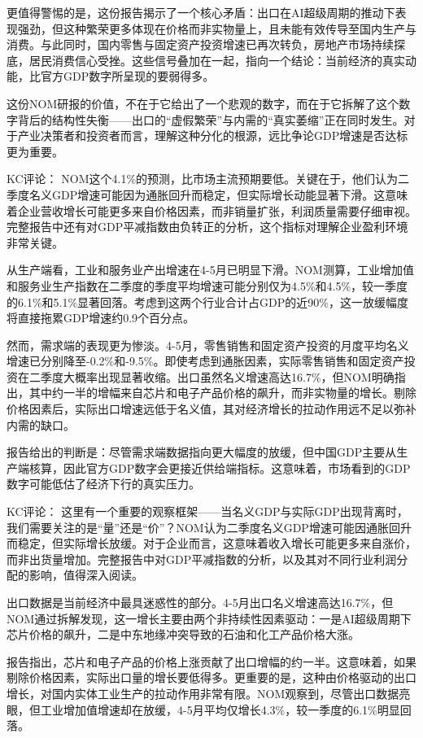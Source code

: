 \documentclass[11pt]{ctexart}
\begin{document}
更值得警惕的是，这份报告揭示了一个核心矛盾：出口在AI超级周期的推动下表现强劲，但这种繁荣更多体现在价格而非实物量上，且未能有效传导至国内生产与消费。与此同时，国内零售与固定资产投资增速已再次转负，房地产市场持续探底，居民消费信心受挫。这些信号叠加在一起，指向一个结论：当前经济的真实动能，比官方GDP数字所呈现的要弱得多。

这份NOM研报的价值，不在于它给出了一个悲观的数字，而在于它拆解了这个数字背后的结构性失衡——出口的“虚假繁荣”与内需的“真实萎缩”正在同时发生。对于产业决策者和投资者而言，理解这种分化的根源，远比争论GDP增速是否达标更为重要。

KC评论： NOM这个4.1\%的预测，比市场主流预期要低。关键在于，他们认为二季度名义GDP增速可能因为通胀回升而稳定，但实际增长动能显著下滑。这意味着企业营收增长可能更多来自价格因素，而非销量扩张，利润质量需要仔细审视。完整报告中还有对GDP平减指数由负转正的分析，这个指标对理解企业盈利环境非常关键。

从生产端看，工业和服务业产出增速在4-5月已明显下滑。NOM测算，工业增加值和服务业生产指数在二季度的季度平均增速可能分别仅为4.5\%和4.5\%，较一季度的6.1\%和5.1\%显著回落。考虑到这两个行业合计占GDP的近90\%，这一放缓幅度将直接拖累GDP增速约0.9个百分点。

然而，需求端的表现更为惨淡。4-5月，零售销售和固定资产投资的月度平均名义增速已分别降至-0.2\%和-9.5\%。即使考虑到通胀因素，实际零售销售和固定资产投资在二季度大概率出现显著收缩。出口虽然名义增速高达16.7\%，但NOM明确指出，其中约一半的增幅来自芯片和电子产品价格的飙升，而非实物量的增长。剔除价格因素后，实际出口增速远低于名义值，其对经济增长的拉动作用远不足以弥补内需的缺口。

报告给出的判断是：尽管需求端数据指向更大幅度的放缓，但中国GDP主要从生产端核算，因此官方GDP数字会更接近供给端指标。这意味着，市场看到的GDP数字可能低估了经济下行的真实压力。

KC评论： 这里有一个重要的观察框架——当名义GDP与实际GDP出现背离时，我们需要关注的是“量”还是“价”？NOM认为二季度名义GDP增速可能因通胀回升而稳定，但实际增长放缓。对于企业而言，这意味着收入增长可能更多来自涨价，而非出货量增加。完整报告中对GDP平减指数的分析，以及其对不同行业利润分配的影响，值得深入阅读。

出口数据是当前经济中最具迷惑性的部分。4-5月出口名义增速高达16.7\%，但NOM通过拆解发现，这一增长主要由两个非持续性因素驱动：一是AI超级周期下芯片价格的飙升，二是中东地缘冲突导致的石油和化工产品价格大涨。

报告指出，芯片和电子产品的价格上涨贡献了出口增幅的约一半。这意味着，如果剔除价格因素，实际出口量的增长要低得多。更重要的是，这种由价格驱动的出口增长，对国内实体工业生产的拉动作用非常有限。NOM观察到，尽管出口数据亮眼，但工业增加值增速却在放缓，4-5月平均仅增长4.3\%，较一季度的6.1\%明显回落。
\end{document}
